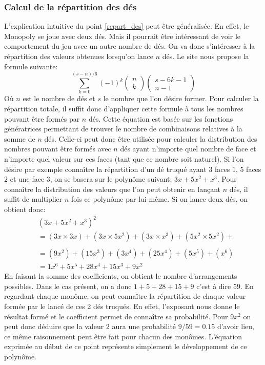 \documentclass[letterpaper]{article}
\begin{document}
    \subsubsection{Calcul de la répartition des dés}
      L'explication intuitive du point \ref{repart_des} peut être généralisée.
      En effet, le Monopoly se joue avec deux dés.  Mais il pourrait être
      intéressant de voir le comportement du jeu avec un autre nombre de dés.
      On va donc s'intéresser à la répartition des valeurs obtenues lorsqu'on
      lance $n$ dés.  Le site \cite{FORMULE_Des} nous propose la formule
      suivante:
      $$\sum\limits_{k=0}^{(s-n)/6} (-1)^k \begin{pmatrix}n \\ k\end{pmatrix}
	\begin{pmatrix}s-6k-1 \\n-1\end{pmatrix}$$
      Où $n$ est le nombre de dés et $s$ le nombre que l'on désire former.
      Pour calculer la répartition totale, il suffit donc d'appliquer cette
      formule à tous les nombres pouvant être formés par $n$ dés.
      Cette équation est basée sur les fonctions génératrices permettant de
      trouver le nombre de combinaisons relatives à la somme de $n$ dés.
      Celle-ci peut donc être utilisée pour calculer la distribution
      des nombres pouvant être formés avec $n$ dés ayant n'importe quel
      nombre de face et n'importe quel valeur sur ces faces (tant que ce
      nombre soit naturel).
      Si l'on désire par exemple connaître la répartition d'un dé truqué
      ayant 3 faces $1$, 5 faces $2$ et une face $3$, on se basera sur le
      polynôme suivant: $3x + 5x^2 + x^3$.  Pour connaître la distribution
      des valeurs que l'on peut obtenir en lançant $n$ dés, il suffit de
      multiplier $n$ fois ce polynôme par lui-même.  Si on lance deux dés,
      on obtient donc:
      \begin{align*}
      &(3x + 5x^2 + x^3)^2\\
      &= (3x \times 3x) + (3x \times 5x^2) + (3x \times x^3) + (5x^2 \times 5x^2) + \\
      \tag*{$(5x^2 \times x^3) + (x^3 \times x^3)$}\\
      &= (9x^2) + (15x^3) + (3x^4) + (25x^4) + (5x^5) + (x^6)\\
      &= 1 x^6 + 5x^5 + 28x^4 + 15x^3 + 9x^2
      \end{align*}
      En faisant la somme des coefficients, on obtient le nombre d'arrangements
      possibles.  Dans le cas présent, on a donc $1 + 5 + 28 + 15 + 9$ c'est à
      dire $59$.  En regardant chaque monôme, on peut connaître la répartition
      de chaque valeur formée par le lancé de ces 2 dés truqués.  En effet,
      l'exposant nous donne le résultat formé et le coefficient permet de
      connaître sa probabilité.  Pour $9 x^2$ on peut donc déduire que la
      valeur $2$ aura une probabilité $9/59 = 0.15$ d'avoir lieu, ce même
      raisonnement peut être fait pour chacun des monômes.
      L'équation exprimée au début de ce point représente simplement le
      développement de ce polynôme.
\end{document}
